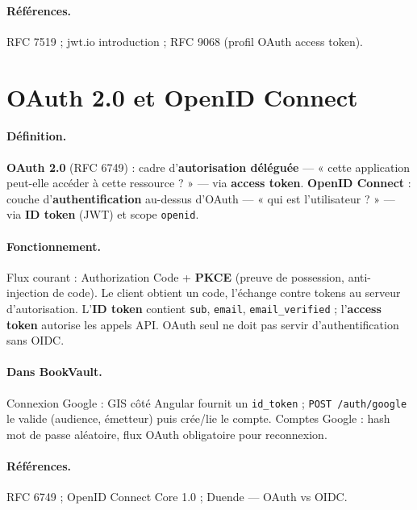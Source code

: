 \documentclass[12pt,a4paper]{report}
\begin{document}
\paragraph{Références.} RFC 7519 ; jwt.io introduction ; RFC 9068 (profil OAuth access token).\par


\section{OAuth 2.0 et OpenID Connect}

\paragraph{Définition.} \textbf{OAuth 2.0} (RFC 6749) : cadre d'\textbf{autorisation déléguée} — « cette application peut-elle accéder à cette ressource ? » — via \textbf{access token}. \textbf{OpenID Connect} : couche d'\textbf{authentification} au-dessus d'OAuth — « qui est l'utilisateur ? » — via \textbf{ID token} (JWT) et scope \texttt{openid}.\par

\paragraph{Fonctionnement.} Flux courant : Authorization Code + \textbf{PKCE} (preuve de possession, anti-injection de code). Le client obtient un code, l'échange contre tokens au serveur d'autorisation. L'\textbf{ID token} contient \texttt{sub}, \texttt{email}, \texttt{email\_verified} ; l'\textbf{access token} autorise les appels API. OAuth seul ne doit pas servir d'authentification sans OIDC.\par

\paragraph{Dans BookVault.} Connexion Google : GIS côté Angular fournit un \texttt{id\_token} ; \texttt{POST /auth/google} le valide (audience, émetteur) puis crée/lie le compte. Comptes Google : hash mot de passe aléatoire, flux OAuth obligatoire pour reconnexion.\par

\paragraph{Références.} RFC 6749 ; OpenID Connect Core 1.0 ; Duende — OAuth vs OIDC.\par
\end{document}
